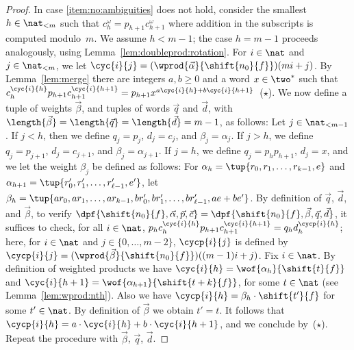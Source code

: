 \begin{proof}
  In case \ref{item:no:ambiguities} does not hold, 
  consider the smallest $h \in \nat_{<m}$ 
  such that $c_h^\omega = p_{h+1} c_{h+1}^\omega$ 
  where addition in the subscripts is computed modulo~$m$.
  We assume $h < m-1$; the case $h = m-1$ proceeds analogously, 
  using Lemma~\ref{lem:doubleprod:rotation}.
  For $i \in \nat$ and $j \in \nat_{<m}$,
  we let $\cyc{i}{j} = (\wprod{\vec{\alpha}}{\shift{n_0}{f}})(mi + j)$.
  By Lemma~\ref{lem:merge} there are integers $a,b \ge 0$ and a word $x \in \two^*$
  such that $c_h^{\cyc{i}{h}} p_{h+1} c_{h+1}^{\cyc{i}{h+1}} = p_{h+1} x^{a \cyc{i}{h} + b \cyc{i}{h+1}}$~($\star$).
We now define a tuple of weights $\vec{\beta}$, 
  and tuples of words $\vec{q}$ and $\vec{d}$, 
  with $\length{\vec{\beta}} = \length{\vec{q}} = \length{\vec{d}} = m - 1$,
  as follows: Let $j \in \nat_{<m-1}$.
  If $j < h$, then we define $q_j = p_j$, $d_j = c_j$, and $\beta_j = \alpha_j$.
  If $j > h$, we define $q_j = p_{j+1}$, $d_j = c_{j+1}$, and $\beta_j = \alpha_{j+1}$.
  If $j = h$, we define $q_j = p_h p_{h+1}$, $d_j = x$, and we let
  the weight $\beta_j$ be defined as follows:
  For $\alpha_h = \tup{r_0,r_1,\ldots,r_{k-1},e}$
  and $\alpha_{h+1} = \tup{r'_0,r'_1,\ldots,r'_{\ell-1},e'}$,
  let $\beta_h = \tup{a r_0, a r_1, \ldots, a r_{k-1}, b r'_0, b r'_1, \ldots, b r'_{\ell - 1}, a e + b e'}$.
By definition of $\vec{q}$, $\vec{d}$, and $\vec{\beta}$,
to verify $\dpf{\shift{n_0}{f},\vec{\alpha},\vec{p},\vec{c}} = \dpf{\shift{n_0}{f},\vec{\beta},\vec{q},\vec{d}}$,
  it suffices to check, for all $i \in \nat$,
  $p_h c_h^{\cyc{i}{h}} p_{h+1} c_{h+1}^{\cyc{i}{h+1}} = q_h d_h^{\cycp{i}{h}}$;
  here, for $i \in \nat$ and $j \in \{0,\ldots,m-2\}$,
  $\cycp{i}{j}$ is defined by $\cycp{i}{j} = (\wprod{\vec{\beta}}{\shift{n_0}{f}})((m-1)i+j)$.
  Fix $i \in \nat$.
  By definition of weighted products we have 
  $\cyc{i}{h} = \wof{\alpha_h}{\shift{t}{f}}$
  and $\cyc{i}{h+1} = \wof{\alpha_{h+1}}{\shift{t + k}{f}}$,
  for some $t \in \nat$ (see Lemma~\ref{lem:wprod:nth}).
Also we have $\cycp{i}{h} = \beta_h \cdot \shift{t'}{f}$ for some $t' \in \nat$.
By definition of $\vec{\beta}$ we obtain $t' = t$.
  It follows that 
  $\cycp{i}{h} = a \cdot \cyc{i}{h} + b \cdot \cyc{i}{h+1}$, 
and we conclude by~($\star$). 
  Repeat the procedure with $\vec{\beta}$, $\vec{q}$, $\vec{d}$.


\end{proof}
